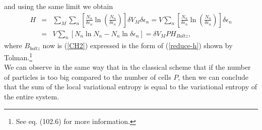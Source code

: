 \documentclass{article}
\newcommand{\de}{\delta}
\begin{document}
{\begin{equation}
\end{equation}
and using the same limit we obtain
\begin{eqnarray}
    H&=& \sum_M \sum_n
    \left[  
           \frac{N_{n}}{ \delta \epsilon_{n}} \ln 
           \left( 
                  \frac{N_{n}}{ \delta \epsilon_{n}}
           \right)
    \right]  \de V_M \delta \epsilon_{n} = V \sum_n
    \left[  
           \frac{N_{n}}{ \delta \epsilon_{n}} \ln 
           \left( 
                  \frac{N_{n}}{ \delta \epsilon_{n}}
           \right)
    \right] \delta \epsilon_{n} \nonumber \\
    &=& V \sum_n \left[N_n \ln N_n - N_n \ln \delta \epsilon_n  \right]=\de V_M P H_{Boltz},\label{h-quantic4}
\end{eqnarray}
where $B_{boltz}$ now is (\ref{CH2}) expressed is the form of (\ref{reduce-h}) shown by Tolman.\footnote{See \cite{tolman} eq. (102.6) for more information.}\\
We can observe in the same way that in the classical scheme that if the number of particles is too big compared to the number of cells $P$, then we can conclude that the sum of the local variational entropy is equal to the variational entropy of the entire system.}

\end{document}
